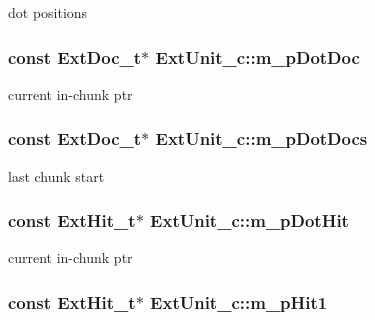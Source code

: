 dot positions 

\hypertarget{classExtUnit__c_af8b0549863ca17a50fef390c1c5f18cb}{
\subsubsection[{m\-\_\-p\-Dot\-Doc}]{\setlength{\rightskip}{0pt plus 5cm}const {\bf Ext\-Doc\-\_\-t}$\ast$ Ext\-Unit\-\_\-c\-::m\-\_\-p\-Dot\-Doc\hspace{0.3cm}{\ttfamily [private]}}}\label{classExtUnit__c_af8b0549863ca17a50fef390c1c5f18cb}


current in-\/chunk ptr 

\hypertarget{classExtUnit__c_a9f1f0ff25b238b440c8dc5a48f6f1757}{
\subsubsection[{m\-\_\-p\-Dot\-Docs}]{\setlength{\rightskip}{0pt plus 5cm}const {\bf Ext\-Doc\-\_\-t}$\ast$ Ext\-Unit\-\_\-c\-::m\-\_\-p\-Dot\-Docs\hspace{0.3cm}{\ttfamily [private]}}}\label{classExtUnit__c_a9f1f0ff25b238b440c8dc5a48f6f1757}


last chunk start 

\hypertarget{classExtUnit__c_a933327239d4d1cb92a214c436868c261}{
\subsubsection[{m\-\_\-p\-Dot\-Hit}]{\setlength{\rightskip}{0pt plus 5cm}const {\bf Ext\-Hit\-\_\-t}$\ast$ Ext\-Unit\-\_\-c\-::m\-\_\-p\-Dot\-Hit\hspace{0.3cm}{\ttfamily [private]}}}\label{classExtUnit__c_a933327239d4d1cb92a214c436868c261}


current in-\/chunk ptr 

\hypertarget{classExtUnit__c_a72772476ca565ef692b5d9a39f9e8817}{
\subsubsection[{m\-\_\-p\-Hit1}]{\setlength{\rightskip}{0pt plus 5cm}const {\bf Ext\-Hit\-\_\-t}$\ast$ Ext\-Unit\-\_\-c\-::m\-\_\-p\-Hit1\hspace{0.3cm}{\ttfamily [private]}}}\label{classExtUnit__c_a72772476ca565ef692b5d9a39f9e8817}


